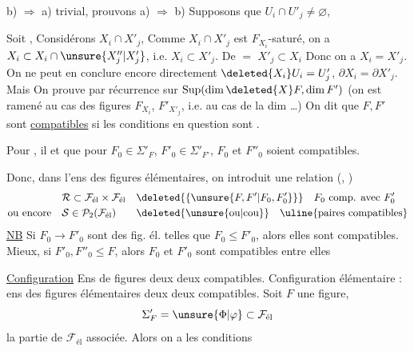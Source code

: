 
b) $\Rightarrow$ a) trivial, prouvons a) $\Rightarrow$ b)  Supposons que $U_i\cap U'_j\ne\varnothing$,  


 Soit  , Considérons $X_i\cap X'_j$,  Comme $X_i\cap X'_j$ est  $F_{X_i}$-saturé,    on a $X_i\subset X_i\cap\unsure{X''_j|X'_j}$,
 i.e. $X_i\subset X'_j$. De $=$ $X'_j\subset X_i$ Donc on a $X_i=X'_j$. On ne peut en conclure encore directement $\deleted{X_i}U_i=U'_j$,   $\partial X_i=\partial X'_j$. Mais
On  prouve  par récurrence sur  $\operatorname{Sup}(\dim\deleted{X}F,\dim F')$ (on est ramené au cas des figures $F_{X_i}$, $F'_{X'_j}$, i.e. au cas de la dim \ldots)
On dit que $F,F'$ sont \uline{compatibles} si les conditions en question sont .

Pour , il  et  que pour  $F_0\in\Sigma'_F$, $F'_0\in\Sigma'_{F'}$, $F_0$ et $F''_0$ soient compatibles.

Donc, dans l'ens  des figures élémentaires, on introduit une relation (, )
\[
\begin{aligned}
&\mathcal{R}\subset\mathcal{F}_{\text{él}}\times\mathcal{F}_{\text{él}}&&\deleted{\{\unsure{F,F'|F_0,F'_0}\}}\quad \text{$F_0$ comp. avec $F'_0$}\\
\text{ou encore}\quad&\mathcal{S}\in\mathcal{P}_2(\mathcal{F}_{\text{él}})&&\deleted{\text{\unsure{ou|cou}}}\quad\text{\uline{paires compatibles}}
\end{aligned}
\]
\uline{NB} Si  $F_0\to F'_0$ sont des fig. él. telles que $F_0\le F'_0$, alors elles sont compatibles. Mieux, si $F'_0,F''_0\le F$, alors $F_0$ et $F'_0$ sont compatibles entre elles

\uline{Configuration} Ens de figures deux  deux compatibles. Configuration élémentaire : ens des figures élémentaires deux  deux compatibles.
Soit $F$ une figure, 
\[
\Sigma'_F=\unsure{\Phi|\varphi}\subset\mathcal{F}_{\text{él}}
\]
la partie de $\mathcal{F}_{\text{él}}$ associée. Alors on a les conditions

